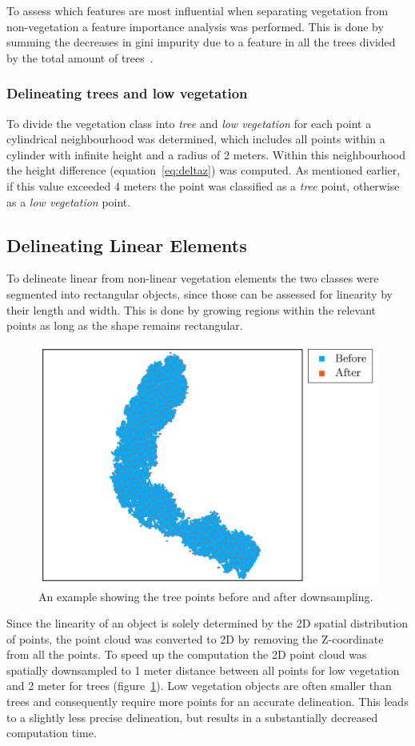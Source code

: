 {To assess which features are most influential when separating vegetation from non-vegetation a feature importance analysis was performed. This is done by summing the decreases in gini impurity due to a feature in all the trees divided by the total amount of trees~\citep{breiman2002manual}.

\subsubsection{Delineating trees and low vegetation}
To divide the vegetation class into \textit{tree} and \textit{low vegetation} for each point a cylindrical neighbourhood was determined, which includes all points within a cylinder with infinite height and a radius of 2 meters. Within this neighbourhood the height difference (equation~\ref{eq:deltaz}) was computed. As mentioned earlier, if this value exceeded 4 meters the point was classified as a \textit{tree} point, otherwise as a \textit{low vegetation} point.

\subsection{Delineating Linear Elements}
To delineate linear from non-linear vegetation elements the two classes were segmented into rectangular objects, since those can be assessed for linearity by their length and width. This is done by growing regions within the relevant points as long as the shape remains rectangular. 

\begin{figure}
	\centering
	\includegraphics[scale=0.40]{./img/downsample}
	\caption{An example showing the tree points before and after downsampling.}
	\label{fig:downsample}
\end{figure}
Since the linearity of an object is solely determined by the 2D spatial distribution of points, the point cloud was converted to 2D by removing the Z-coordinate from all the points. To speed up the computation the 2D point cloud was spatially downsampled to 1 meter distance between all points for low vegetation and 2 meter for trees (figure~\ref{fig:downsample}). Low vegetation objects are often smaller than trees and consequently require more points for an accurate delineation. This leads to a slightly less precise delineation, but results in a substantially decreased computation time.

}
